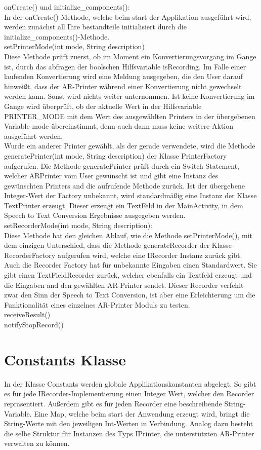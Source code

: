 onCreate() und initialize\_components():\\
In der onCreate()-Methode, welche beim start der Applikation ausgeführt wird, werden zunächst all Ihre bestandteile initialisiert durch die initialize\_components()-Methode.\\
setPrinterMode(int mode, String description)\\
Diese Methode prüft zuerst, ob im Moment ein Konvertierungsvorgang im Gange ist, durch das abfragen der boolschen Hilfsvariable isRecording. Im Falle einer laufenden Konvertierung wird eine Meldung ausgegeben, die den User darauf hinweißt, dass der AR-Printer während einer Konvertierung nicht gewechselt werden kann. Sonst wird nichts weiter unternommen.
Ist keine Konvertierung im Gange wird überprüft, ob der aktuelle Wert in der Hilfsvariable PRINTER\_MODE mit dem Wert des ausgewählten Printers in der übergebenen Variable mode übereinstimmt, denn auch dann muss keine weitere Aktion ausgeführt werden.\\
Wurde ein anderer Printer gewählt, als der gerade verwendete, wird die Methode generatePrinter(int mode, String description) der Klasse PrinterFactory aufgerufen. Die Methode generatePrinter prüft durch ein Switch Statement, welcher ARPrinter vom User gewünscht ist und gibt eine Instanz des gewünschten Printers and die aufrufende Methode zurück. Ist der übergebene Integer-Wert der Factory unbekannt, wird standardmäßig eine Instanz der Klasse TextPrinter erzeugt. Dieser erzeugt ein TextFeld in der MainActivity, in dem Speech to Text Conversion Ergebnisse ausgegeben werden.\\
setRecorderMode(int mode, String description):\\
Diese Methode hat den gleichen Ablauf, wie die Methode setPrinterMode(), mit dem einzigen Unterschied, dass die Methode generateRecorder der Klasse RecorderFactory aufgerufen wird, welche eine IRecorder Instanz zurück gibt. Auch die Recorder Factory hat für unbekannte Eingaben einen Standardwert. Sie gibt einen TextFieldRecorder zurück, welcher ebenfalls ein Textfeld erzeugt und die Eingaben and den gewählten AR-Printer sendet. Dieser Recorder verfehlt zwar den Sinn der Speech to Text Conversion, ist aber eine Erleichterung um die Funktionalität eines einzelnes AR-Printer Moduls zu testen.\\

receiveResult()\\
notifyStopRecord()\\

\section{Constants Klasse}
In der Klasse Constants werden globale Applikationskonstanten abgelegt. So gibt es für jede IRecorder-Implementierung einen Integer Wert, welcher den Recorder repräsentiert. Außerdem gibt es für jeden Recorder eine beschreibende String-Variable. Eine Map, welche beim start der Anwendung erzeugt wird, bringt die String-Werte mit den jeweiligen Int-Werten in Verbindung. Analog dazu besteht die selbe Struktur für Instanzen des Typs IPrinter, die unterstützten AR-Printer verwalten zu können.


